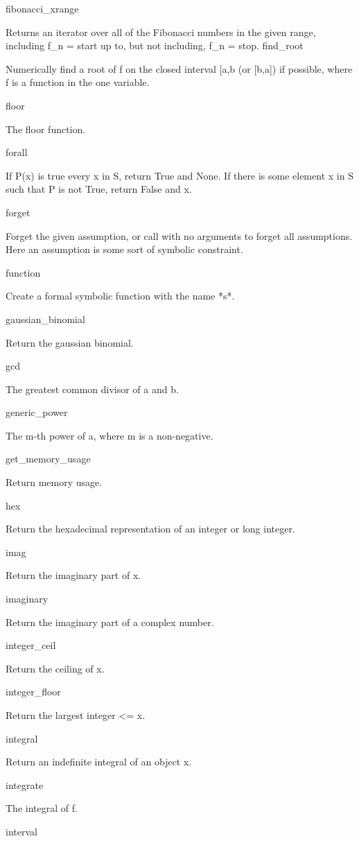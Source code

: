 \documentclass[12pt,oneside]{book}
\begin{document}
fibonacci\_xrange

Returns an iterator over all of the Fibonacci numbers in the given range, including f\_n = start up to, but not including, f\_n = stop.  find\_root

Numerically find a root of f on the closed interval [a,b (or [b,a]) if possible, where f is a function in the one variable.

floor

The floor function.

forall

If P(x) is true every x in S, return True and None. If there is some element x in S such that P is not True, return False and x.

forget

Forget the given assumption, or call with no arguments to forget all assumptions. Here an assumption is some sort of symbolic constraint.

function

Create a formal symbolic function with the name *s*.

gaussian\_binomial

Return the gaussian binomial.

gcd

The greatest common divisor of a and b.

generic\_power

The m{}-th power of a, where m is a non{}-negative.

get\_memory\_usage

Return memory usage.

hex

Return the hexadecimal representation of an integer or long integer.

imag

Return the imaginary part of x.

imaginary

Return the imaginary part of a complex number.

integer\_ceil

Return the ceiling of x.

integer\_floor

Return the largest integer {\textless}= x.

integral \ \ \ \ 

Return an indefinite integral of an object x.

integrate \ \ \ \ 

The integral of f.

interval \ \ \ \ 
\end{document}
